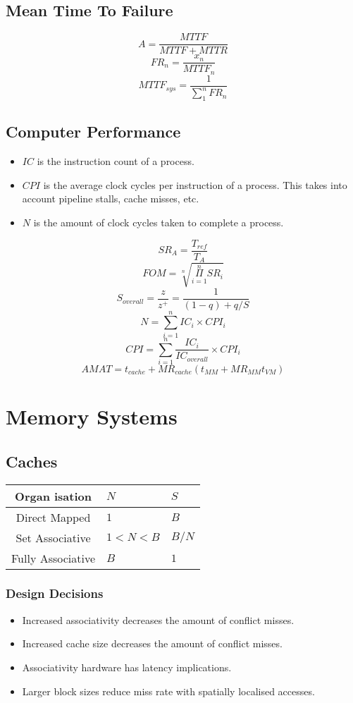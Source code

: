 \documentclass[8pt]{extarticle}
\begin{document}
\begin{multicols}{3}
\subsection{Mean Time To Failure}
\[ A = \frac{MTTF}{MTTF + MTTR} \]
\[ FR_n = \frac{x_{n}}{MTTF_{n}} \]
\[ MTTF_{sys} = \frac{1}{\sum_{1}^{n} FR_{n}} \]

\subsection{Computer Performance}
\begin{itemize}
  \item \(IC\) is the instruction count of a process.
  \item \(CPI\) is the average clock cycles per instruction of a process. This
    takes into account pipeline stalls, cache misses, etc.
  \item \(N\) is the amount of clock cycles taken to complete a process.
\end{itemize}

\[ SR_{A} = \frac{T_{ref}}{T_{A}} \]
\[ FOM = \sqrt[n]{\overset{n}{\underset{i=1}{\Pi}} SR_{i}} \]
\[ S_{overall} = \frac{z}{z^+} = \frac{1}{(1-q) + q / S} \]
\[ N = \sum_{i=1}^{n} IC_{i} \times CPI_{i} \]
\[ CPI = \sum_{i=1}^{n} \frac{IC_{i}}{IC_{overall}} \times CPI_{i} \]
\[ AMAT = t_{cache} + MR_{cache} (t_{MM} + MR_{MM} t_{VM}) \]

\section{Memory Systems}

\subsection{Caches}
\begin{tabular}{| c | l | l |}
  \hline
  Organ isation & \(N\) & \(S\) \\
  \hline
  Direct Mapped & \(1\) & \(B\) \\
  Set Associative & \(1 < N < B\) & \(B/N\) \\
  Fully Associative & \(B\) & \(1\) \\
  \hline
\end{tabular}

\subsubsection{Design Decisions}
\begin{itemize}
  \item Increased associativity decreases the amount of conflict misses.
  \item Increased cache size decreases the amount of conflict misses.
  \item Associativity hardware has latency implications.
  \item Larger block sizes reduce miss rate with spatially localised accesses.
\end{itemize}


\end{multicols}
\end{document}
